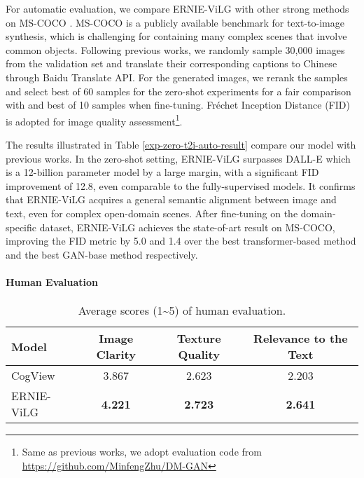 \documentclass{article}
\begin{document}
For automatic evaluation, we compare ERNIE-ViLG with other strong methods on MS-COCO \cite{lin2014microsoft}. MS-COCO is a publicly available benchmark for text-to-image synthesis, which is challenging for containing many complex scenes that involve common objects. Following previous works, we randomly sample 30,000 images from the validation set and translate their corresponding captions to Chinese through Baidu Translate API. For the generated images, we rerank the samples and select best of 60 samples for the zero-shot experiments for a fair comparison with \cite{ding2021cogview} and best of 10 samples when fine-tuning. Fr\'{e}chet Inception Distance (FID) \cite{heusel2017gans} is adopted for image quality assessment\footnote{Same as previous works, we adopt evaluation code from \href{https://github.com/MinfengZhu/DM-GAN}{https://github.com/MinfengZhu/DM-GAN}}.

The results illustrated in Table \ref{exp-zero-t2i-auto-result} compare our model with previous works. In the zero-shot setting, ERNIE-ViLG surpasses DALL-E which is a 12-billion parameter model by a large margin, with a significant FID improvement of 12.8, even comparable to the fully-supervised models. It confirms that ERNIE-ViLG acquires a general semantic alignment between image and text, even for complex open-domain scenes. After fine-tuning on the domain-specific dataset, ERNIE-ViLG achieves the state-of-art result on MS-COCO, improving the FID metric by 5.0 and 1.4 over the best transformer-based method and the best GAN-base method respectively.

\paragraph{Human Evaluation}
\begin{table}[htb]
 \caption{Average scores (1\textasciitilde5) of human evaluation.}
  \centering
  \begin{tabular}{l|c|c|c}
    \toprule
    Model & Image Clarity & Texture Quality & Relevance to the Text \\ \midrule
    CogView     & 3.867 & 2.623 & 2.203  \\  
    ERNIE-ViLG  & \textbf{4.221} & \textbf{2.723} & \textbf{2.641}  \\
    \bottomrule
  \end{tabular}
  \label{exp-zero-t2i-human-result}
\end{table}
\end{document}
